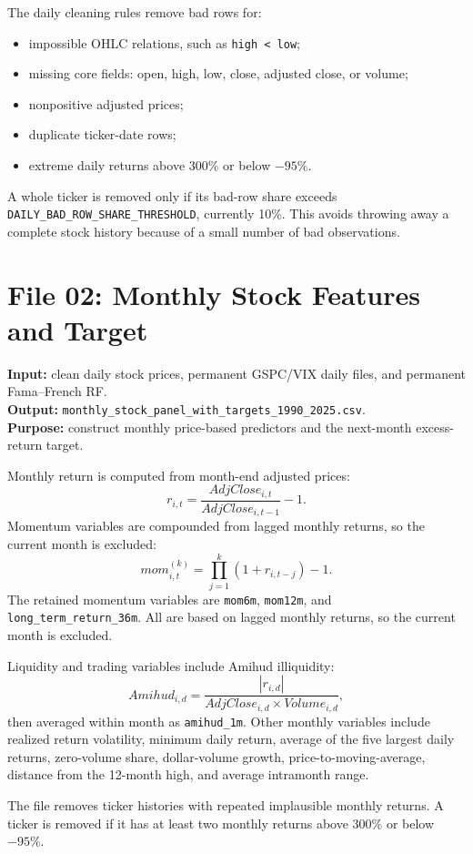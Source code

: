 \documentclass[11pt,a4paper]{article}
\newcommand{\code}[1]{\texttt{#1}}
\begin{document}
The daily cleaning rules remove bad rows for:
\begin{itemize}
  \item impossible OHLC relations, such as \code{high < low};
  \item missing core fields: open, high, low, close, adjusted close, or volume;
  \item nonpositive adjusted prices;
  \item duplicate ticker-date rows;
  \item extreme daily returns above 300\% or below $-95\%$.
\end{itemize}

A whole ticker is removed only if its bad-row share exceeds \code{DAILY\_BAD\_ROW\_SHARE\_THRESHOLD}, currently 10\%. This avoids throwing away a complete stock history because of a small number of bad observations.

\section{File 02: Monthly Stock Features and Target}

\textbf{Input:} clean daily stock prices, permanent GSPC/VIX daily files, and permanent Fama--French RF. \\
\textbf{Output:} \code{monthly\_stock\_panel\_with\_targets\_1990\_2025.csv}. \\
\textbf{Purpose:} construct monthly price-based predictors and the next-month excess-return target.

Monthly return is computed from month-end adjusted prices:
\[
  r_{i,t}=\frac{AdjClose_{i,t}}{AdjClose_{i,t-1}}-1.
\]
Momentum variables are compounded from lagged monthly returns, so the current month is excluded:
\[
  mom_{i,t}^{(k)}=\prod_{j=1}^{k}(1+r_{i,t-j})-1.
\]
The retained momentum variables are \code{mom6m}, \code{mom12m}, and \code{long\_term\_return\_36m}. All are based on lagged monthly returns, so the current month is excluded.

Liquidity and trading variables include Amihud illiquidity:
\[
  Amihud_{i,d}=\frac{|r_{i,d}|}{AdjClose_{i,d}\times Volume_{i,d}},
\]
then averaged within month as \code{amihud\_1m}. Other monthly variables include realized return volatility, minimum daily return, average of the five largest daily returns, zero-volume share, dollar-volume growth, price-to-moving-average, distance from the 12-month high, and average intramonth range.

The file removes ticker histories with repeated implausible monthly returns. A ticker is removed if it has at least two monthly returns above 300\% or below $-95\%$.
\end{document}
